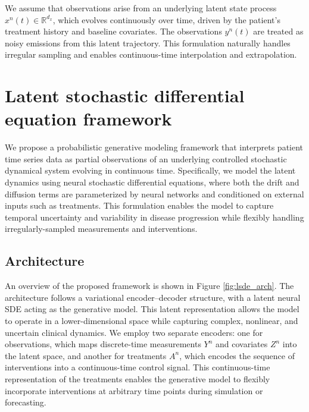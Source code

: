 \documentclass[preprint,12pt]{elsarticle}
\begin{document}
We assume that observations arise from an underlying latent state process $x^n(t) \in \mathbb{R}^{d_x}$, which evolves continuously over time, driven by the patient’s treatment history and baseline covariates. The observations $y^n(t)$ are treated as noisy emissions from this latent trajectory. This formulation naturally handles irregular sampling and enables continuous-time interpolation and extrapolation.


\section{Latent stochastic differential equation framework}

We propose a probabilistic generative modeling framework that interprets patient time series data as partial observations of an underlying controlled stochastic dynamical system evolving in continuous time. 
Specifically, we model the latent dynamics using neural stochastic differential equations, where both the drift and diffusion terms are parameterized by neural networks and conditioned on external inputs such as treatments. 
This formulation enables the model to capture temporal uncertainty and variability in disease progression while flexibly handling irregularly-sampled measurements and interventions.

\subsection{Architecture}
An overview of the proposed framework is shown in Figure \ref{fig:lsde_arch}. The architecture follows a variational encoder–decoder structure, with a latent neural SDE acting as the generative model. This latent representation allows the model to operate in a lower-dimensional space while capturing complex, nonlinear, and uncertain clinical dynamics. 
We employ two separate encoders: one for observations, which maps discrete-time measurements $Y^n$ and covariates $Z^n$ into the latent space, and another for treatments $A^n$, which encodes the sequence of interventions into a continuous-time control signal. This continuous-time representation of the treatments enables the generative model to flexibly incorporate interventions at arbitrary time points during simulation or forecasting.
\end{document}
